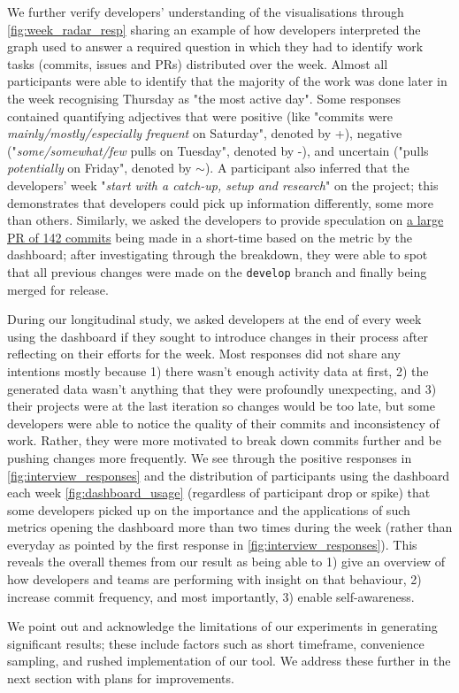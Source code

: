 \documentclass[../mpaper.tex]{subfiles}
\begin{document}
We further verify developers' understanding of the visualisations through \autoref{fig:week_radar_resp} sharing an example of how developers interpreted the graph used to answer a required question in which they had to identify work tasks (commits, issues and PRs) distributed over the week. Almost all participants were able to identify that the majority of the work was done later in the week recognising Thursday as "the most active day". Some responses contained quantifying adjectives that were positive (like "commits were \textit{mainly/mostly/especially frequent} on Saturday", denoted by +), negative ("\textit{some/somewhat/few} pulls on Tuesday", denoted by -), and uncertain ("pulls \textit{potentially} on Friday", denoted by $\sim$). A participant also inferred that the developers' week "\textit{start with a catch-up, setup and research}" on the project; this demonstrates that developers could pick up information differently, some more than others. Similarly, we asked the developers to provide speculation on \href{https://github.com/ineshbose/portion-mate/pull/140}{a large PR of 142 commits} being made in a short-time based on the metric by the dashboard; after investigating through the breakdown, they were able to spot that all previous changes were made on the \texttt{develop} branch and finally being merged for release.

During our longitudinal study, we asked developers at the end of every week using the dashboard if they sought to introduce changes in their process after reflecting on their efforts for the week. Most responses did not share any intentions mostly because 1) there wasn't enough activity data at first, 2) the generated data wasn't anything that they were profoundly unexpecting, and 3) their projects were at the last iteration so changes would be too late, but some developers were able to notice the quality of their commits and inconsistency of work. Rather, they were more motivated to break down commits further and be pushing changes more frequently. We see through the positive responses in \autoref{fig:interview_responses} and the distribution of participants using the dashboard each week \autoref{fig:dashboard_usage} (regardless of participant drop or spike) that some developers picked up on the importance and the applications of such metrics opening the dashboard more than two times during the week (rather than everyday as pointed by the first response in \autoref{fig:interview_responses}). This reveals the overall themes from our result as being able to 1) give an overview of how developers and teams are performing with insight on that behaviour, 2) increase commit frequency, and most importantly, 3) enable self-awareness.

We point out and acknowledge the limitations of our experiments in generating significant results; these include factors such as short timeframe, convenience sampling, and rushed implementation of our tool. We address these further in the next section with plans for improvements.
\end{document}
